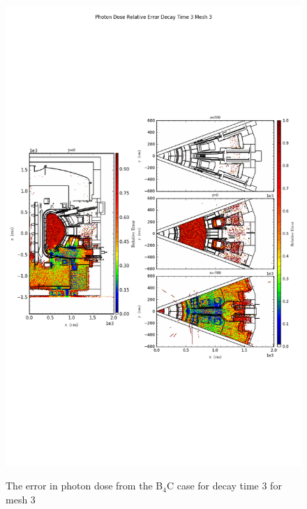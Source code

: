 \begin{figure}[ht!]
\centering
\includegraphics[trim={0cm 9cm 0cm 10cm},clip,scale=0.75]{../plots/final_model_with_b4c/Photon_Dose_Relative_Error_Decay_Time_3_Mesh_3.png}
\label{fig:photons_dc3_no4bc_m3_error}
\caption{The error in photon dose from the B$_4$C case for decay time 3 for mesh 3}
\end{figure}
